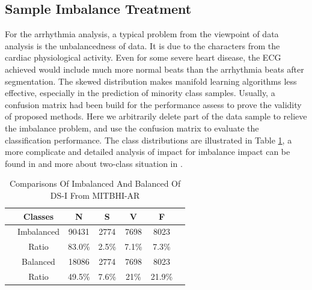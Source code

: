 \documentclass[journal]{IEEEtran}
\begin{document}
%
%
\subsection{Sample Imbalance Treatment}
For the arrhythmia analysis, a typical problem from the viewpoint of data analysis is the unbalancedness of data.
It is due to the characters from the cardiac physiological activity.
Even for some severe heart disease, the ECG achieved would include much more normal beats than the arrhythmia beats after segmentation.
The skewed distribution makes manifold learning algorithms less effective, especially in the prediction of minority class samples.
Usually, a confusion matrix had been build for the performance assess to prove the validity of proposed methods.
Here we arbitrarily delete part of the data sample to relieve the imbalance problem, and use the confusion matrix to evaluate the classification performance. 
The class distributions are illustrated in Table \ref{distriofData}, a more complicate and detailed analysis of impact for imbalance impact can be found in \cite{wang2012multiclass} and more about two-class situation in \cite{he2009learning}.



\begin{table}[!htbp]
\begin{center}
\begin{threeparttable}
\caption{Comparisons Of Imbalanced And Balanced Of DS-I From MITBHI-AR}
\label{distriofData}
\begin{tabular}{ccccccc}
\hline
& Classes & N & S & V  & F \\
\hline
& Imbalanced  &90431  & 2774  & 7698   &8023\\
& Ratio & 83.0\%&  2.5\%& 7.1\%  & 7.3\% \\
\hline
& Balanced  & 18086 & 2774  & 7698 & 8023         \\
& Ratio & 49.5\%&  7.6\%& 21\%  & 21.9\% \\
\hline
\end{tabular}
\end{threeparttable}
\end{center}
\end{table}
     

%
%                
%
     
\end{document}
